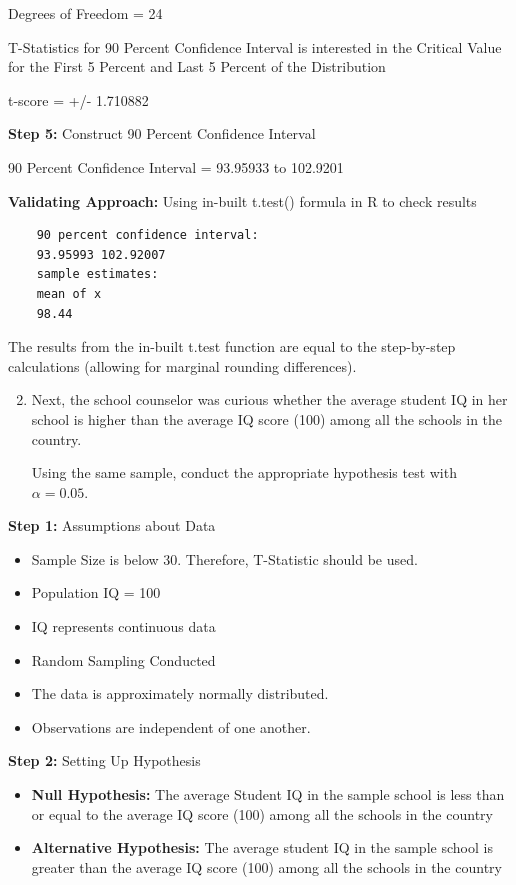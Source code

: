 \documentclass[12pt,letterpaper]{article}
\begin{document}
Degrees of Freedom = 24

\vspace{.5cm}
\noindent T-Statistics for 90 Percent Confidence Interval is interested in the Critical Value for the First 5 Percent and Last 5 Percent of the Distribution 
 
t-score = +/- 1.710882

\vspace{.5cm}
\noindent\textbf{Step 5: }Construct 90 Percent Confidence Interval 
 
90 Percent Confidence Interval = 93.95933 to 102.9201

\vspace{.5cm}
\noindent \textbf{Validating Approach:} Using in-built t.test() formula in R to check results

\begin{verbatim}
	90 percent confidence interval:
	93.95993 102.92007
	sample estimates:
	mean of x 
	98.44 
\end{verbatim}
The results from the in-built t.test function are equal to the step-by-step calculations (allowing for marginal rounding differences). 

\newpage 
\begin{enumerate}
\setcounter{enumi}{1}
	\item Next, the school counselor was curious  whether  the average student IQ in her school is higher than the average IQ score (100) among all the schools in the country. 
	
	\noindent Using the same sample, conduct the appropriate hypothesis test with $\alpha=0.05$.
\end{enumerate}
\textbf{Step 1:} Assumptions about Data
\begin{itemize}
\item
Sample Size is below 30. Therefore, T-Statistic should be used.
\item 
Population IQ = 100
\item
IQ represents continuous data
\item
Random Sampling Conducted
\item
The data is approximately normally distributed. 
\item
Observations are independent of one another. 
\end{itemize}
\vspace{.5cm}
\textbf{Step 2: }Setting Up Hypothesis
\begin{itemize}
\item
\textbf{Null Hypothesis:} The average Student IQ in the sample school is less than or equal to the average IQ score (100) among all the schools in the country 
\item
\textbf{Alternative Hypothesis:} The average student IQ in the sample school is greater than the average IQ score (100) among all the schools in the country
\end{itemize}
\end{document}
